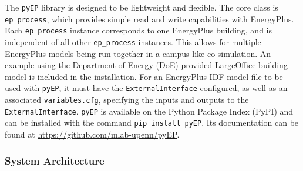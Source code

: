 The \texttt{pyEP} library is designed to be lightweight and flexible. 
The core class is \texttt{ep\_process}, which provides simple read and write capabilities with EnergyPlus. 
Each \texttt{ep\_process} instance corresponds to one EnergyPlus building, and is independent of all other \texttt{ep\_process} instances. 
This allows for multiple EnergyPlus models being run together in a campus-like co-simulation. 
An example using the Department of Energy (DoE) provided LargeOffice building model is included in the installation. 
For an EnergyPlus IDF model file to be used with \texttt{pyEP}, it must have the \texttt{ExternalInterface} configured, as well as an associated \texttt{variables.cfg}, specifying the inputs and outputs to the \texttt{ExternalInterface}.
\texttt{pyEP} is available on the Python Package Index (PyPI) and can be installed with the command \verb|pip install pyEP|.
Its documentation can be found at \url{https://github.com/mlab-upenn/pyEP}.

\subsubsection{System Architecture}


